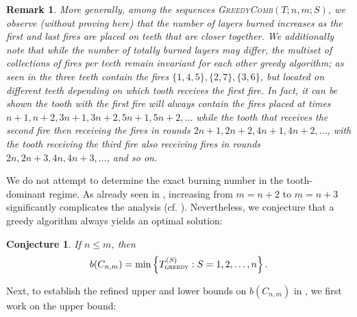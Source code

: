 \documentclass{article}
\newcommand{\gr}{\textsc{greedy}}
\newtheorem{conjecture}{Conjecture}
\newtheorem{remark}{Remark}
\begin{document}
\begin{remark}
    More generally, among the sequences 
\textsc{GreedyComb}$(T;n,m;S)$, we observe (without proving here) that the number of layers burned increases as the 
first and last fires are placed on teeth that are closer together. We additionally note that while the number of totally burned layers may differ, the multiset of collections of fires per teeth remain invariant for each other greedy algorithm; as seen in  the three teeth contain the fires $\{1,4,5\}, \{2,7\}, \{3,6\}$, but located on different teeth depending on which tooth receives the first fire. In fact, it can be shown the tooth with the first fire will always contain the fires placed at times $n+1,n+2,3n+1,3n+2, 5n+1,5n+2,\ldots$ while the tooth that receives the second fire then receiving the fires in rounds $2n+1,2n+2,4n+1,4n+2,\ldots$, with the tooth receiving the third fire also receiving fires in rounds $2n,2n+3, 4n,4n+3, \ldots$, and so on.
\end{remark}

We do not attempt to determine the exact burning number in the 
tooth-dominant regime. As already seen in , increasing from 
$m = n+2$ to $m = n+3$ significantly complicates the analysis (cf. 
). Nevertheless, we conjecture that a greedy algorithm always 
yields an optimal solution:

\begin{conjecture}\label{conj: tooth greedy}
If $n \le m$, then
\[
b(C_{n,m}) = \min\left\{T_\gr^{(S)} : S = 1,2,\ldots,n\right\}.
\]
\end{conjecture}

Next, to establish the refined upper and lower bounds on $b(C_{n,m})$ in , we first work on the upper bound:
\end{document}
